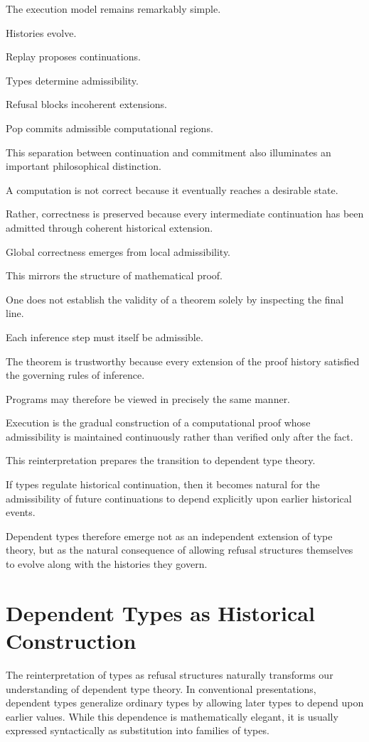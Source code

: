 \documentclass[12pt,oneside]{article}
\theoremstyle{definition}
\theoremstyle{remark}
\begin{document}
The execution model remains remarkably simple.

Histories evolve.

Replay proposes continuations.

Types determine admissibility.

Refusal blocks incoherent extensions.

Pop commits admissible computational regions.

This separation between continuation and commitment also illuminates an
important philosophical distinction.

A computation is not correct because it eventually reaches a desirable state.

Rather, correctness is preserved because every intermediate continuation has
been admitted through coherent historical extension.

Global correctness emerges from local admissibility.

This mirrors the structure of mathematical proof.

One does not establish the validity of a theorem solely by inspecting the
final line.

Each inference step must itself be admissible.

The theorem is trustworthy because every extension of the proof history
satisfied the governing rules of inference.

Programs may therefore be viewed in precisely the same manner.

Execution is the gradual construction of a computational proof whose
admissibility is maintained continuously rather than verified only after the
fact.

This reinterpretation prepares the transition to dependent type theory.

If types regulate historical continuation, then it becomes natural for the
admissibility of future continuations to depend explicitly upon earlier
historical events.

Dependent types therefore emerge not as an independent extension of type
theory, but as the natural consequence of allowing refusal structures
themselves to evolve along with the histories they govern.

\section{Dependent Types as Historical Construction}

The reinterpretation of types as refusal structures naturally transforms our
understanding of dependent type theory. In conventional presentations,
dependent types generalize ordinary types by allowing later types to depend
upon earlier values. While this dependence is mathematically elegant, it is
usually expressed syntactically as substitution into families of types.
\end{document}
